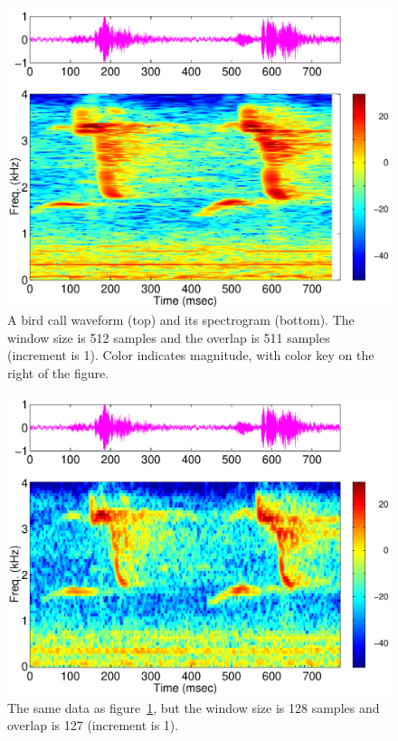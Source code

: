 \begin{figure}[p]
\centerline{\includegraphics[height=0.35\textheight]{ch-fft/ufft_cardinal1_spg512_511}}
\caption[Bird call waveform and spectrogram; window size 512 samples,
overlap 511]{A bird call waveform (top) and its spectrogram
  (bottom). The window size is 512 samples and the overlap is 511
  samples (increment is 1). Color indicates magnitude, with color key
  on the right of the figure.\label{fig:ufft-birdspg-c1}}
\end{figure}

\begin{figure}
\centerline{\includegraphics[height=0.35\textheight]{ch-fft/ufft_cardinal1_spg128_127}}
\caption[Bird call waveform and spectrogram; window size 128 samples,
overlap 127]{The same data as figure~\ref{fig:ufft-birdspg-c1}, but
  the window size is 128 samples and overlap is 127 (increment is
  1).\label{fig:ufft-birdspg-c2}}
\end{figure}

